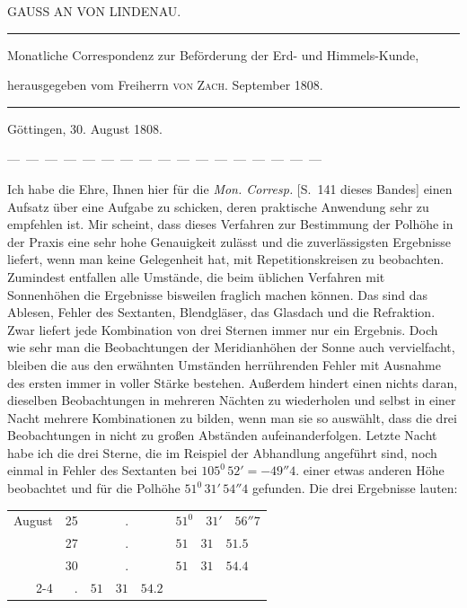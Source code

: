 \clearpage{}%
\begin{center}
{\small GAUSS AN VON LINDENAU.\par}
\medskip\hrule\medskip
{\small Monatliche Correspondenz zur Beförderung der Erd- und Himmels-Kunde,\par
herausgegeben vom Freiherrn \textsc{von Zach}. September 1808.\par}
\medskip\hrule
\end{center}\medskip
\begin{flushright}Göttingen, 30. August 1808.\end{flushright}
\begin{center}\small
—\ —\ —\ —\ —\ —\ —\ —\ —\ —\ —\ —\ —\ —\ —\ —\ —
\end{center}
Ich habe die Ehre, Ihnen hier für die \emph{Mon. Corresp.} [S.\ 141 dieses Bandes] einen Aufsatz über eine Aufgabe zu schicken, deren praktische Anwendung sehr zu empfehlen ist. Mir scheint, dass dieses Verfahren zur Bestimmung der Polhöhe in der Praxis eine sehr hohe Genauigkeit zulässt und die zuverlässigsten Ergebnisse liefert, wenn man keine Gelegenheit hat, mit Repetitionskreisen zu beobachten. Zumindest entfallen alle Umstände, die beim üblichen Verfahren mit Sonnenhöhen die Ergebnisse bisweilen fraglich machen können. Das sind das Ablesen, Fehler des Sextanten, Blendgläser, das Glasdach und die Refraktion. Zwar liefert jede Kombination von drei Sternen immer nur ein Ergebnis. Doch wie sehr man die Beobachtungen der Meridianhöhen der Sonne auch vervielfacht, bleiben die aus den erwähnten Umständen herrührenden Fehler mit Ausnahme des ersten immer in voller Stärke bestehen. Außerdem hindert einen nichts daran, dieselben Beobachtungen in mehreren Nächten zu wiederholen und selbst in einer Nacht mehrere Kombinationen zu bilden, wenn man sie so auswählt, dass die drei Beobachtungen in nicht zu großen Abständen aufeinanderfolgen. Letzte Nacht habe ich die drei Sterne, die im Reispiel der Abhandlung angeführt sind, noch einmal in
%
\expandafter\def\csname HistoricalNoteText7\endcsname{Fehler des Sextanten bei $105^0\,52'= -49''4$.}%
einer etwas anderen Höhe beobachtet und für die Polhöhe $51^0\,31'\,54''4$ gefunden. Die drei Ergebnisse lauten:
\begin{center}
\begin{tabular}{@{}r@{\ }r@{\quad}c@{\quad}l@{}}
August & 25 & $.$ & $51^0\quad31'\quad56''7$\\
       & 27 & $.$ & $51\quad31\quad51.5$\\
       & 30 & $.$ & $51\quad31\quad54.4$\\\cline{2-4}
\multicolumn{2}{@{}r@{\quad}}{im Mittel} & $.$ & $51\quad31\quad54.2$
\end{tabular}
\end{center}
